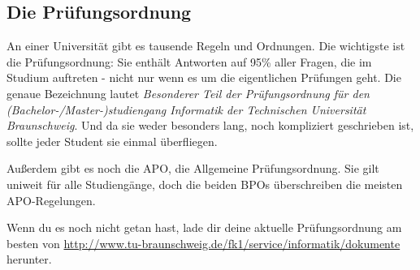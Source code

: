 \begin{multicols}{2}
\subsection{Die Prüfungsordnung}
\label{po}
	An einer Universität gibt es tausende Regeln und Ordnungen. Die wichtigste ist die Prüfungsordnung: Sie enthält Antworten auf 95\% aller Fragen, die im Studium auftreten - nicht nur wenn es um die eigentlichen Prüfungen geht. Die genaue Bezeichnung lautet \emph{Besonderer Teil der Prüfungsordnung für den (Bachelor-/Master-)studiengang Informatik der Technischen Universität Braunschweig}. Und da sie weder besonders lang, noch kompliziert geschrieben ist, sollte jeder Student sie einmal überfliegen.

	Außerdem gibt es noch die APO, die Allgemeine Prüfungsordnung. Sie gilt uniweit für alle Studiengänge, doch die beiden BPOs überschreiben die meisten APO-Regelungen.

	Wenn du es noch nicht getan hast, lade dir deine aktuelle Prüfungsordnung am besten von \url{http://www.tu-braunschweig.de/fk1/service/informatik/dokumente} herunter. 
\end{multicols}


